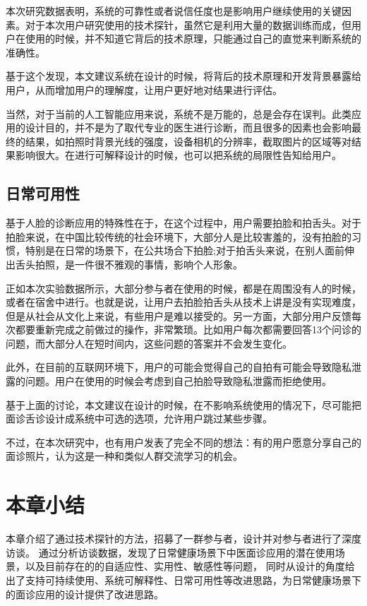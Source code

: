 本次研究数据表明，系统的可靠性或者说信任度也是影响用户继续使用的关键因素。对于本次用户研究使用的技术探针，虽然它是利用大量的数据训练而成，但用户在使用的时候，并不知道它背后的技术原理，只能通过自己的直觉来判断系统的准确性。

基于这个发现，本文建议系统在设计的时候，将背后的技术原理和开发背景暴露给用户，从而增加用户的理解度，让用户更好地对结果进行评估。

当然，对于当前的人工智能应用来说，系统不是万能的，总是会存在误判。此类应用的设计目的，并不是为了取代专业的医生进行诊断，而且很多的因素也会影响最终的结果，如拍照时背景光线的强度，设备相机的分辨率，截取图片的区域等对结果影响很大。在进行可解释设计的时候，也可以把系统的局限性告知给用户。

\subsection{日常可用性}
基于人脸的诊断应用的特殊性在于，在这个过程中，用户需要拍脸和拍舌头。对于拍脸来说，在中国比较传统的社会环境下，大部分人是比较害羞的，没有拍脸的习惯，特别是在日常的场景下，在公共场合下拍脸;对于拍舌头来说，在别人面前伸出舌头拍照，是一件很不雅观的事情，影响个人形象。

正如本次实验数据所示，大部分参与者在使用的时候，都是在周围没有人的时候，或者在宿舍中进行。也就是说，让用户去拍脸拍舌头从技术上讲是没有实现难度，但是从社会从文化上来说，有些用户是难以接受的。另一方面，大部分用户反馈每次都要重新完成之前做过的操作，非常繁琐。比如用户每次都需要回答13个问诊的问题，而大部分人在短时间内，这些问题的答案并不会发生变化。

此外，在目前的互联网环境下，用户的可能会觉得自己的自拍有可能会导致隐私泄露的问题。用户在使用的时候会考虑到自己拍脸导致隐私泄露而拒绝使用。

基于上面的讨论，本文建议在设计的时候，在不影响系统使用的情况下，尽可能把面诊舌诊设计成系统中可选的选项，允许用户跳过某些步骤。

不过，在本次研究中，也有用户发表了完全不同的想法：有的用户愿意分享自己的面诊照片，认为这是一种和类似人群交流学习的机会。

\section{本章小结}

本章介绍了通过技术探针的方法，招募了一群参与者，设计并对参与者进行了深度访谈。
通过分析访谈数据，发现了日常健康场景下中医面诊应用的潜在使用场景，以及目前存在的的自适应性、实用性、敏感性等问题，
同时从设计的角度给出了支持可持续使用、系统可解释性、日常可用性等改进思路，为日常健康场景下的面诊应用的设计提供了改进思路。


